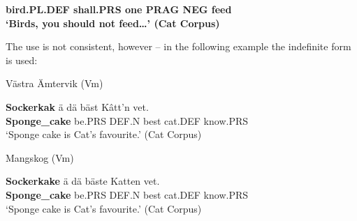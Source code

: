 \bfseries
bird.PL.DEF  shall.PRS  one  PRAG  NEG  feed\\

\glt ‘Birds, you should not feed…’ (Cat Corpus)

\z

The use is not consistent, however – in the following example the indefinite form is used:


\item 


\item 

Västra Ämtervik (Vm) 



 \ea\label{}
\gll \textbf{Sockerkak} ä  dä  bäst  Kâtt’n  vet.\\


\textbf{Sponge\_cake} be.PRS  DEF.N  best  cat.DEF  know.PRS\\

\glt ‘Sponge cake is Cat’s favourite.’ (Cat Corpus)

\z

\item 

Mangskog (Vm) 



 \ea\label{}
\gll \textbf{Sockerkake} ä  dä  bäste  Katten  vet.\\


\textbf{Sponge\_cake} be.PRS  DEF.N  best  cat.DEF  know.PRS\\

\glt ‘Sponge cake is Cat’s favourite.’ (Cat Corpus)

